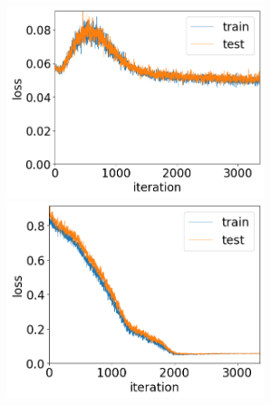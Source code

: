 \documentclass[11pt,a4paper,uplatex,draft]{ujarticle}
\begin{document}
  \clearpage
  \begin{figure}[tbp]
    \begin{minipage}[b]{0.5\textwidth}
      \centering
      \includegraphics[keepaspectratio, width=75mm]{Images/python/loss_202402051754.png}
    \end{minipage}
    \begin{minipage}[b]{0.5\textwidth}
      \centering
      \includegraphics[keepaspectratio, width=75mm]{Images/python/loss_202402052233.png}
    \end{minipage}
  \end{figure}
\end{document}
